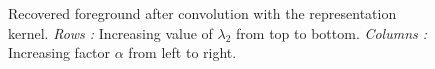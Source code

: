     \begin{figure}[p]
        \caption{Recovered foreground after convolution with the representation kernel. \textit{Rows :} Increasing value of $\lambda_2$ from top to bottom. \textit{Columns :} Increasing factor $\alpha$ from left to right.}
        \label{fig:simple:fg-merged}        
    \end{figure}


